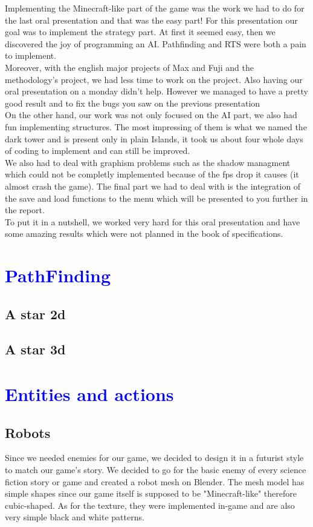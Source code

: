 \documentclass[article]{report}             %
\begin{document}
			Implementing the Minecraft-like part of the game was the work we had to do for the last oral presentation and that was the easy part! For this presentation our goal was to implement the strategy part. At first it seemed easy, then we discovered the joy of programming an AI. Pathfinding and RTS were both a pain to implement. \\

 			Moreover, with the english major projects of Max and Fuji and the methodology's project, we had less time to work on the project. Also having our oral presentation on a monday didn't help. However we managed to have a pretty good result and to fix the bugs you saw on the previous presentation\\

 			On the other hand, our work was not only focused on the AI part, we also had fun implementing structures. The most impressing of them is what we named the dark tower and is present only in plain Islands, it took us about four whole days of coding to implement and can still be improved.\\
			
			We also had to deal with graphism problems such as the shadow managment which could not be completly implemented because of the fps drop it causes (it almost crash the game). The final part we had to deal with is the integration of the save and load functions to the menu which will be presented to you further in the report.\\
			
			To put it in a nutshell, we worked very hard for this oral presentation and have some amazing results which were not planned in the book of specifications. 
  		\chapter{\textcolor{blue}{PathFinding}}
			\section{A star 2d}
			\section{A star 3d}
				
		\chapter{\textcolor{blue}{Entities and actions}}
			\section{Robots}
				Since we needed enemies for our game, we decided to design it in a futurist style to match our game's story. We decided to go for the basic enemy of every science fiction story or game and created a robot mesh on Blender. The mesh model has simple shapes since our game itself is supposed to be "Minecraft-like" therefore cubic-shaped. As for the texture, they were implemented in-game and are also very simple black and white patterns.\\
\end{document}
